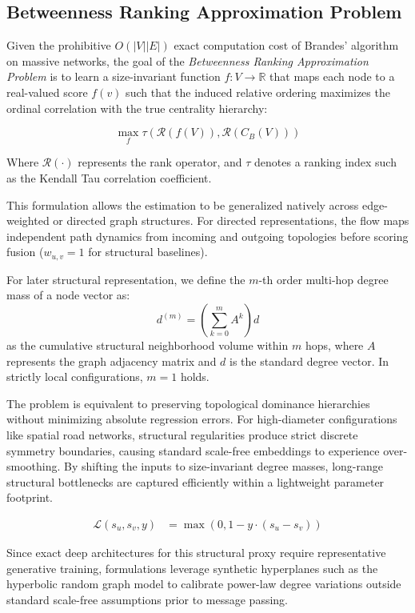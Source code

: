 \subsection{Betweenness Ranking Approximation Problem}
 Given the prohibitive $O(|V||E|)$ exact computation cost of Brandes' algorithm on massive networks,
 the goal of the \emph{Betweenness Ranking Approximation Problem} is to learn a size-invariant function $f: V \rightarrow \mathbb{R}$
that maps each node to a real-valued score $f(v)$ such that the induced relative ordering maximizes the ordinal correlation 
with the true centrality hierarchy:

\begin{equation}
    \max_{f} \tau \left( \mathcal{R}(f(V)), \mathcal{R}(C_B(V)) \right) \label{eq:ranking-objective}
\end{equation}

Where $\mathcal{R}(\cdot)$ represents the rank operator, and $\tau$ denotes a ranking index such as the Kendall Tau correlation coefficient.

This formulation allows the estimation to be generalized natively across edge-weighted or directed graph structures.
 For directed representations, the flow maps independent path dynamics from incoming and outgoing topologies before scoring fusion ($w_{u,v}=1$ for structural baselines).

For later structural representation, we define the $m$-th order multi-hop degree mass of a node vector as:
\begin{equation}
    d^{(m)}=\left(\sum_{k=0}^{m}A^{k}\right)d
\end{equation}
as the cumulative structural neighborhood volume within $m$ hops, where $A$ represents the graph adjacency matrix and $d$ is the standard degree vector. In strictly local configurations, $m=1$ holds.

The problem is equivalent to preserving topological dominance hierarchies without minimizing absolute regression errors.
 For high-diameter configurations like spatial road networks, structural regularities produce strict discrete symmetry boundaries,
  causing standard scale-free embeddings to experience over-smoothing.
   By shifting the inputs to size-invariant degree masses, long-range structural bottlenecks are captured efficiently
    within a lightweight parameter footprint.

\begin{align}
    \mathcal{L}(s_u, s_v, y) & = \max(0, 1 - y \cdot (s_u - s_v))
\end{align}

Since exact deep architectures for this structural proxy require representative generative training,
 formulations leverage synthetic hyperplanes such as the hyperbolic random graph model to calibrate power-law
  degree variations outside standard scale-free assumptions prior to message passing.